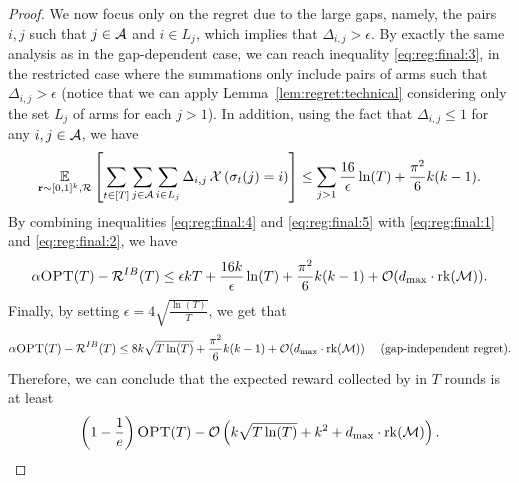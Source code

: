 \begin{proof}
We now focus only on the regret due to the large gaps, namely, the pairs $i,j$ such that $j \in \operatorname{\mathcal{A}}$ and $i \in L_j$, which implies that $\Delta_{i,j} > \epsilon$. By exactly the same analysis as in the gap-dependent case, we can reach inequality \eqref{eq:reg:final:3}, in the restricted case where the summations only include pairs of arms such that $\Delta_{i,j} > \epsilon$ (notice that we can apply Lemma~\ref{lem:regret:technical} considering only the set $L_j$ of arms for each $j>1$). In addition, using the fact that $\Delta_{i,j} \leq 1$ for any $i,j \in \operatorname{\mathcal{A}}$, we have 
\begin{align}
    \mathop{\underset{\operatorname{\mathbf{r}} \sim [0,1]^k, \mathcal{R}}{\mathbb{E}}\left[\sum_{t \in [T]}\sum_{j \in \operatorname{\mathcal{A}}}\sum_{i \in L_j} \Delta_{i,j} \mathop{\mathcal{X}\left(\sigma_t(j) = i\right)}\right]} \leq 
    \sum_{j >1 } \frac{16}{\epsilon}\ln(T) + \frac{\pi^2}{6} k (k-1). \label{eq:reg:final:5}
\end{align}
By combining inequalities \eqref{eq:reg:final:4} and \eqref{eq:reg:final:5} with \eqref{eq:reg:final:1} and \eqref{eq:reg:final:2}, we have
\begin{align*}
    \alpha \textsc{OPT}(T) - \operatorname{\mathcal{R}}^{IB}(T) \leq \epsilon k T + \frac{16 k }{\epsilon}\ln(T) + \frac{\pi^2}{6} k(k-1) + \mathcal{O}(d_{\max}\cdot \operatorname{rk}(\operatorname{\mathcal{M}})).
\end{align*}
Finally, by setting $\epsilon = 4 \sqrt{\frac{\ln(T)}{T}}$, we get that 
\begin{align*}
   \alpha \textsc{OPT}(T) - \operatorname{\mathcal{R}}^{IB}(T) \leq 8 k \sqrt{T \ln(T)} + \frac{\pi^2}{6} k(k-1) + \mathcal{O}(d_{\max}\cdot \operatorname{rk}(\operatorname{\mathcal{M}}))\quad \text{ (gap-independent regret)}.
\end{align*}
Therefore, we can conclude that the expected reward collected by \UCB in $T$ rounds is at least
\begin{align*}
    \left(1-\frac{1}{e}\right)\textsc{OPT}(T) - \mathcal{O}\left(k \sqrt{T \ln(T)} + k^2 + d_{\max}\cdot \operatorname{rk}(\operatorname{\mathcal{M}}) \right).
\end{align*}
\end{proof}